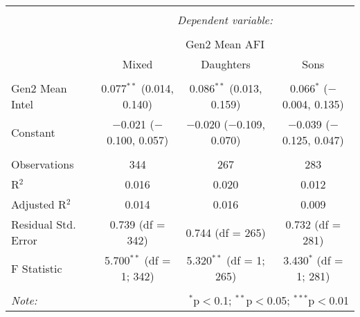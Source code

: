 
\begingroup 
\small 
\begin{tabular}{@{\extracolsep{1pt}}lccc} 
\\[-1.8ex]\hline 
\hline \\[-1.8ex] 
 & \multicolumn{3}{c}{\textit{Dependent variable:}} \\ 
\cline{2-4} 
\\[-1.8ex] & \multicolumn{3}{c}{Gen2 Mean AFI} \\ 
 & Mixed & Daughters & Sons \\ 
\hline \\[-1.8ex] 
 Gen2 Mean Intel & 0.077$^{**}$ (0.014, 0.140) & 0.086$^{**}$ (0.013, 0.159) & 0.066$^{*}$ ($-$0.004, 0.135) \\ 
  Constant & $-$0.021 ($-$0.100, 0.057) & $-$0.020 ($-$0.109, 0.070) & $-$0.039 ($-$0.125, 0.047) \\ 
 \hline \\[-1.8ex] 
Observations & 344 & 267 & 283 \\ 
R$^{2}$ & 0.016 & 0.020 & 0.012 \\ 
Adjusted R$^{2}$ & 0.014 & 0.016 & 0.009 \\ 
Residual Std. Error & 0.739 (df = 342) & 0.744 (df = 265) & 0.732 (df = 281) \\ 
F Statistic & 5.700$^{**}$ (df = 1; 342) & 5.320$^{**}$ (df = 1; 265) & 3.430$^{*}$ (df = 1; 281) \\ 
\hline 
\hline \\[-1.8ex] 
\textit{Note:}  & \multicolumn{3}{r}{$^{*}$p$<$0.1; $^{**}$p$<$0.05; $^{***}$p$<$0.01} \\ 
\end{tabular} 
\endgroup 
